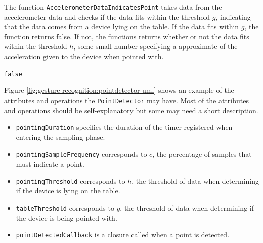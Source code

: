 The function \texttt{AccelerometerDataIndicatesPoint} takes data from the accelerometer data and checks if the data fits within the threshold $g$, indicating that the data comes from a device lying on the table. If the data fits within $g$, the function returns false. If not, the functions returns whether or not the data fits within the threshold $h$, some small number specifying a approximate of the acceleration given to the device when pointed with.

\begin{algorithmic}
    \State \Return \texttt{false}
  \Else
    \State \Return {}
  \EndIf
\EndFunction
\end{algorithmic}

Figure \ref{fig:gesture-recognition:pointdetector-uml} shows an example of the attributes and operations the \texttt{PointDetector} may have. Most of the attributes and operations should be self-explanatory but some may need a short description.

\begin{itemize}
\item \texttt{pointingDuration} specifies the duration of the timer registered when entering the sampling phase.
\item \texttt{pointingSampleFrequency} corresponds to $c$, the percentage of samples that must indicate a point.
\item \texttt{pointingThreshold} corresponds to $h$, the threshold of data when determining if the device is lying on the table.
\item \texttt{tableThreshold} corresponds to $g$, the threshold of data when determining if the device is being pointed with.
\item \texttt{pointDetectedCallback} is a closure called when a point is detected.
\end{itemize}

